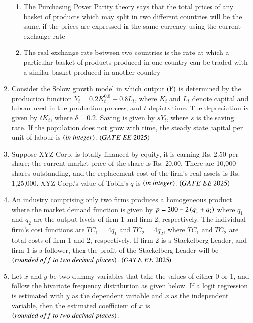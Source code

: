 \documentclass[journal,12pt,onecolumn]{IEEEtran}
\theoremstyle{remark}
\begin{document}
\begin{enumerate}
\begin{enumerate}
\item The Purchasing Power Parity theory says that the total prices of any basket of products which may split in two different countries will be the same, if the prices are expressed in the same currency using the current exchange rate
\item The real exchange rate between two countries is the rate at which a particular basket of products produced in one country can be traded with a similar basket produced in another country
\end{enumerate}
\item Consider the Solow growth model in which output $\left(Y\right)$ is determined by the production function $Y_t = 0.2 K_t^{0.8} + 0.8 L_t$, where $K_t$ and $L_t$ denote capital and labour used in the production process, and $t$ depicts time. The depreciation is given by $\delta K_t$, where $\delta = 0.2$. Saving is given by $sY_t$, where $s$ is the saving rate. If the population does not grow with time, the steady state capital per unit of labour is \underline{\hspace{2cm}} $\left(in\ integer\right)$. 
\hfill $\brak{GATE\ EE\ 2025}$
\item Suppose XYZ Corp. is totally financed by equity, it is earning Rs. 2.50 per share; the current market price of the share is Rs. 20.00. There are 10,000 shares outstanding, and the replacement cost of the firm's real assets is Rs. 1,25,000. XYZ Corp.'s value of Tobin's $q$ is \underline{\hspace{2cm}} $\left(in\ integer\right)$. 
 \hfill $\brak{GATE\ EE\ 2025}$
\item An industry comprising only two firms produces a homogeneous product where the market demand function is given by $p = 200 - 2\left(q_1 + q_2\right)$ where $q_1$ and $q_2$ are the output levels of firm 1 and firm 2, respectively. The individual firm's cost functions are $TC_1 = 4q_1$ and $TC_2 = 4q_2$, where $TC_1$ and $TC_2$ are total costs of firm 1 and 2, respectively. If firm 2 is a Stackelberg Leader, and firm 1 is a follower, then the profit of the Stackelberg Leader will be \underline{\hspace{2cm}} $\brak{rounded\ off\ to\ two\ decimal\ places}$. 
 \hfill $\brak{GATE\ EE\ 2025}$
\item Let $x$ and $y$ be two dummy variables that take the values of either 0 or 1, and follow the bivariate frequency distribution as given below. If a logit regression is estimated with $y$ as the dependent variable and $x$ as the independent variable, then the estimated coefficient of $x$ is \underline{\hspace{2cm}} $\brak{rounded\ off\ to\ two\ decimal\ places}$.

\end{enumerate}
\end{document}
